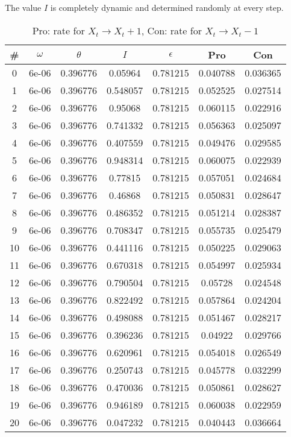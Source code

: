 The value $I$ is completely dynamic and determined randomly at every step.\begin{table}
\caption{Pro: rate for $X_t \rightarrow X_t + 1$, Con: rate for $X_t \rightarrow X_t - 1$}
\begin{tabular*}{\linewidth}{c|c|c|c|c|c|c}
\# & $\omega$ & $\theta$ & $I$ & $\epsilon$ & Pro & Con \\
\hline
0 & 6e-06 & 0.396776 & 0.05964 & 0.781215 & 0.040788 & 0.036365\\
1 & 6e-06 & 0.396776 & 0.548057 & 0.781215 & 0.052525 & 0.027514\\
2 & 6e-06 & 0.396776 & 0.95068 & 0.781215 & 0.060115 & 0.022916\\
3 & 6e-06 & 0.396776 & 0.741332 & 0.781215 & 0.056363 & 0.025097\\
4 & 6e-06 & 0.396776 & 0.407559 & 0.781215 & 0.049476 & 0.029585\\
5 & 6e-06 & 0.396776 & 0.948314 & 0.781215 & 0.060075 & 0.022939\\
6 & 6e-06 & 0.396776 & 0.77815 & 0.781215 & 0.057051 & 0.024684\\
7 & 6e-06 & 0.396776 & 0.46868 & 0.781215 & 0.050831 & 0.028647\\
8 & 6e-06 & 0.396776 & 0.486352 & 0.781215 & 0.051214 & 0.028387\\
9 & 6e-06 & 0.396776 & 0.708347 & 0.781215 & 0.055735 & 0.025479\\
10 & 6e-06 & 0.396776 & 0.441116 & 0.781215 & 0.050225 & 0.029063\\
11 & 6e-06 & 0.396776 & 0.670318 & 0.781215 & 0.054997 & 0.025934\\
12 & 6e-06 & 0.396776 & 0.790504 & 0.781215 & 0.05728 & 0.024548\\
13 & 6e-06 & 0.396776 & 0.822492 & 0.781215 & 0.057864 & 0.024204\\
14 & 6e-06 & 0.396776 & 0.498088 & 0.781215 & 0.051467 & 0.028217\\
15 & 6e-06 & 0.396776 & 0.396236 & 0.781215 & 0.04922 & 0.029766\\
16 & 6e-06 & 0.396776 & 0.620961 & 0.781215 & 0.054018 & 0.026549\\
17 & 6e-06 & 0.396776 & 0.250743 & 0.781215 & 0.045778 & 0.032299\\
18 & 6e-06 & 0.396776 & 0.470036 & 0.781215 & 0.050861 & 0.028627\\
19 & 6e-06 & 0.396776 & 0.946189 & 0.781215 & 0.060038 & 0.022959\\
20 & 6e-06 & 0.396776 & 0.047232 & 0.781215 & 0.040443 & 0.036664\\

\end{tabular*}
\end{table}
